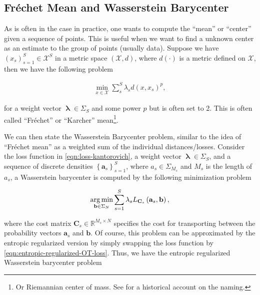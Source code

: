 
\subsection{Fr\'echet Mean and Wasserstein Barycenter}\label{subsec:frechet-mean-and-wasserstein-barycenter}

As is often in the case in practice, one wants to compute the ``mean'' or ``center'' given a sequence of points.
This is useful when we want to find a unknown center as an estimate to the group of points (usually data).
Suppose we have $\left(x_s\right)_{s = 1}^S \in \mathcal{X}^S$ in a metric space $\left(\mathcal{X}, d\right)$,
where $d(\cdot)$ is a metric defined on $\mathcal{X}$,
then we have the following problem

\begin{equation*}
  \begin{aligned}
    \min_{x \in \mathcal{X}} \sum_s^S \lambda_s d(x, x_s)^p,
  \end{aligned}
\end{equation*}

for a weight vector $\boldsymbol{\uplambda} \in \Sigma_S$ and some power $p$ but is often set to 2.
This is often called ``Fr\'echet'' or ``Karcher'' mean\footnote{
  Or Riemannian center of mass.
  See \citet{karcher2014} for a historical account on the naming.
}.

We can then state the Wasserstein Barycenter problem, similar to the idea of ``Fr\'echet mean''
as a weighted sum of the individual distances/losses.
Consider the loss function in \cref{eqn:loss-kantorovich},
a weight vector $\boldsymbol{\uplambda} \in \Sigma_S$,
and a sequence of discrete densities $\left\{\mathbf{a}_s\right\}_{s = 1}^S$,
where $a_s \in \Sigma_{M_s}$ and $M_s$ is the length of $a_s$,
a Wasserstein barycenter is computed by the following minimization problem

\begin{equation*}
  \begin{aligned}
    \operatorname*{arg\,min}_{\mathbf{b} \in \Sigma_N} \sum_{s=1}^S \lambda_s L_{\mathbf{C}_s} \left(\mathbf{a}_s, \mathbf{b}\right),
  \end{aligned}
\end{equation*}

where the cost matrix $\mathbf{C}_s \in \mathbb{R}^{M_s \times N}$ specifies the cost for transporting
between the probability vectors $\mathbf{a}_s$ and $\mathbf{b}$.
Of course, this problem can be approximated by the entropic regularized version
by simply swapping the loss function by \cref{eqn:entropic-regularized-OT-loss}.
Thus, we have the entropic regularized Wasserstein barycenter problem

